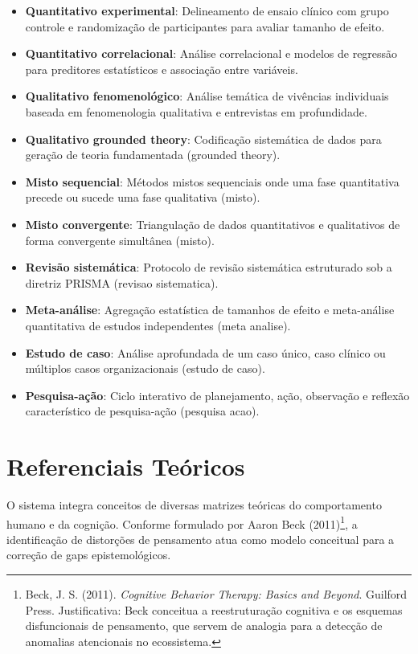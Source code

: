 \documentclass[12pt,a4paper,oneside]{abntex2}
\begin{document}
\begin{apendicesenv}
\begin{itemize}
    \item \textbf{Quantitativo experimental}: Delineamento de ensaio clínico com grupo controle e randomização de participantes para avaliar tamanho de efeito.

    \item \textbf{Quantitativo correlacional}: Análise correlacional e modelos de regressão para preditores estatísticos e associação entre variáveis.

    \item \textbf{Qualitativo fenomenológico}: Análise temática de vivências individuais baseada em fenomenologia qualitativa e entrevistas em profundidade.

    \item \textbf{Qualitativo grounded theory}: Codificação sistemática de dados para geração de teoria fundamentada (grounded theory).

    \item \textbf{Misto sequencial}: Métodos mistos sequenciais onde uma fase quantitativa precede ou sucede uma fase qualitativa (misto).

    \item \textbf{Misto convergente}: Triangulação de dados quantitativos e qualitativos de forma convergente simultânea (misto).

    \item \textbf{Revisão sistemática}: Protocolo de revisão sistemática estruturado sob a diretriz PRISMA (revisao sistematica).

    \item \textbf{Meta-análise}: Agregação estatística de tamanhos de efeito e meta-análise quantitativa de estudos independentes (meta analise).

    \item \textbf{Estudo de caso}: Análise aprofundada de um caso único, caso clínico ou múltiplos casos organizacionais (estudo de caso).

    \item \textbf{Pesquisa-ação}: Ciclo interativo de planejamento, ação, observação e reflexão característico de pesquisa-ação (pesquisa acao).
\end{itemize}

\section{Referenciais Teóricos}

O sistema integra conceitos de diversas matrizes teóricas do comportamento humano e da cognição. Conforme formulado por Aaron Beck (2011)\footnote{Beck, J. S. (2011). \textit{Cognitive Behavior Therapy: Basics and Beyond}. Guilford Press. Justificativa: Beck conceitua a reestruturação cognitiva e os esquemas disfuncionais de pensamento, que servem de analogia para a detecção de anomalias atencionais no ecossistema.}, a identificação de distorções de pensamento atua como modelo conceitual para a correção de gaps epistemológicos.


\end{apendicesenv}
\end{document}
